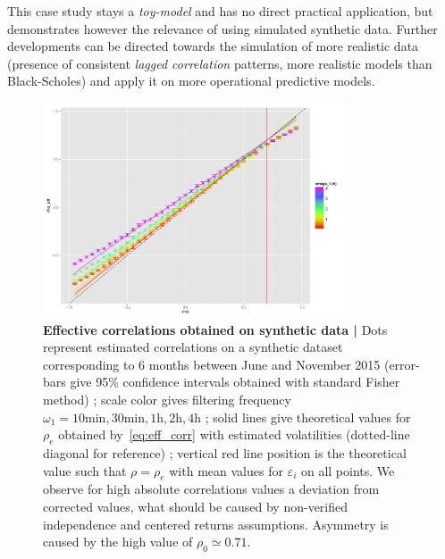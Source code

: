 This case study stays a \emph{toy-model} and has no direct practical application, but demonstrates however the relevance of using simulated synthetic data. Further developments can be directed towards the simulation of more realistic data (presence of consistent \emph{lagged correlation} patterns, more realistic models than Black-Scholes) and apply it on more operational predictive models.





\begin{figure}[h!]
\centering
\includegraphics[width=0.8\textwidth,height=0.3\textheight]{figures/effectiveCorrs_withGoodTh_A4}
\caption{\small\textbf{Effective correlations obtained on synthetic data | } Dots represent estimated correlations on a synthetic dataset corresponding to 6 months between June and November 2015 (error-bars give 95\% confidence intervals obtained with standard Fisher method) ; scale color gives filtering frequency $\omega_1=10\textrm{min},30\textrm{min},1\textrm{h},2\textrm{h},4\textrm{h}$ ; solid lines give theoretical values for $\rho_e$ obtained by~\ref{eq:eff_corr} with estimated volatilities (dotted-line diagonal for reference) ; vertical red line position is the theoretical value such that $\rho = \rho_e$ with mean values for $\varepsilon_i$ on all points. We observe for high absolute correlations values a deviation from corrected values, what should be caused by non-verified independence and centered returns assumptions. Asymmetry is caused by the high value of $\rho_0 \simeq 0.71$.}
\label{fig:effective_corrs}
\end{figure}


